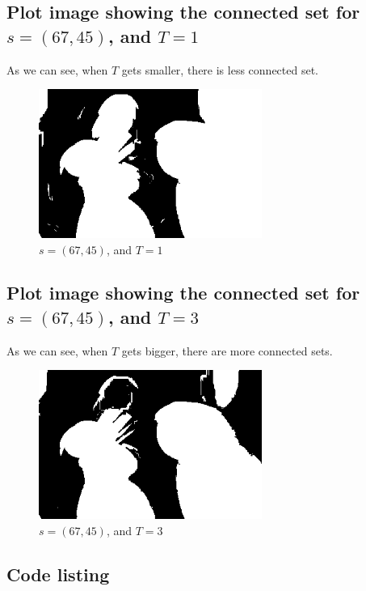 \documentclass{article}
\begin{document}
\subsection{Plot image showing the connected set for $s=(67,45)$, and $T=1$}
	As we can see, when $T$ gets smaller, there is less connected set.
	\begin{figure}[h]
		\begin{center}
			\includegraphics[width=0.65\textwidth]{img22gd2_af1.png}
			\caption{$s=(67,45)$, and $T=1$}
		\end{center}
	\end{figure}

\pagebreak

\subsection{Plot image showing the connected set for $s=(67,45)$, and $T=3$}
	As we can see, when $T$ gets bigger, there are more connected sets.
	\begin{figure}[h]
		\begin{center}
			\includegraphics[width=0.65\textwidth]{img22gd2_af3.png}
			\caption{$s=(67,45)$, and $T=3$}
		\end{center}
	\end{figure}

\subsection{Code listing}
\end{document}
